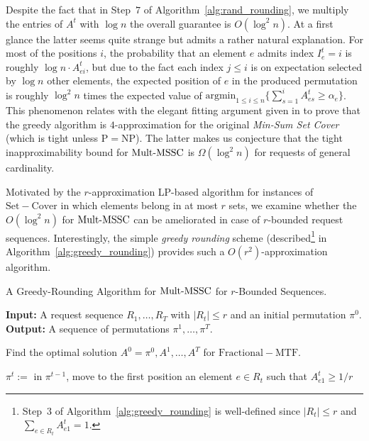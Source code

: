 \noindent Despite the fact that in Step~$7$ of Algorithm~\ref{alg:rand_rounding}, we multiply the entries of $A^t$ with $\log n$ the overall guarantee is $O(\log^2 n)$. At a first glance the latter seems quite strange but admits a rather natural explanation. For most of the positions $i$, the probability that an element $e$ admits index $I_e^t = i$ is roughly $\log n \cdot A_{ei}^t$, but due to the fact each index $j \leq i$ is on expectation  selected by $\log n$ other elements, the expected position of $e$ in the produced permutation is roughly $ \log^2 n$ times the expected value of
$\mathrm{argmin}_{1\leq i \leq n} \{ \sum_{s=1}^i A_{es}^t \geq \alpha_e\}$. This phenomenon relates with the elegant fitting argument given in \cite{FLT04} to prove that the greedy algorithm is $4$-approximation for the original \textit{Min-Sum Set Cover} (which is tight unless $\mathrm{P}= \mathrm{NP}$). %
The latter makes us conjecture that the tight inapproximability bound for $\mathrm{Mult}\text{-}\mathrm{MSSC}$ is $\Omega(\log^2 n)$ for requests of general cardinality. 

Motivated by the $r$-approximation LP-based algorithm for instances of 
$\mathrm{Set-Cover}$ in which elements belong in at most $r$ sets, we examine whether the $O(\log^2 n)$ for $\mathrm{Mult}\text{-}\mathrm{MSSC}$
can be ameliorated in case of $r$-bounded request sequences. Interestingly, the simple \textit{greedy rounding} scheme (described\footnote{Step~$3$ of Algorithm~\ref{alg:greedy_rounding} is well-defined since $|R_t| \leq r$ and $\sum_{e \in R_t}A_{e1}^t = 1$.} in Algorithm~\ref{alg:greedy_rounding}) provides such a $O(r^2)$-approximation algorithm.
\begin{algorithm}[H]
  \caption{A Greedy-Rounding Algorithm for $\mathrm{Mult}\text{-}\mathrm{MSSC}$ for $r$-Bounded Sequences.}\label{alg:greedy_rounding}
  \textbf{Input:} A request sequence $R_1,\ldots,R_T$ with $|R_t| \leq r$ and an initial permutation $\pi^0$.\\
  \textbf{Output:} A sequence of permutations $\pi^1,\ldots,\pi^T$.

 \begin{algorithmic}[1]
 \STATE Find the optimal solution $A^0=\pi^0,A^1,\ldots,A^T$ for $\mathrm{Fractional-MTF}$. 

 
              
        \STATE $\pi^t:=$ in $\pi^{t-1}$, move to the first position an element $e \in R_t$
        such that $A_{e1}^t \geq 1/r$
\ENDFOR
  \end{algorithmic}
\end{algorithm}

